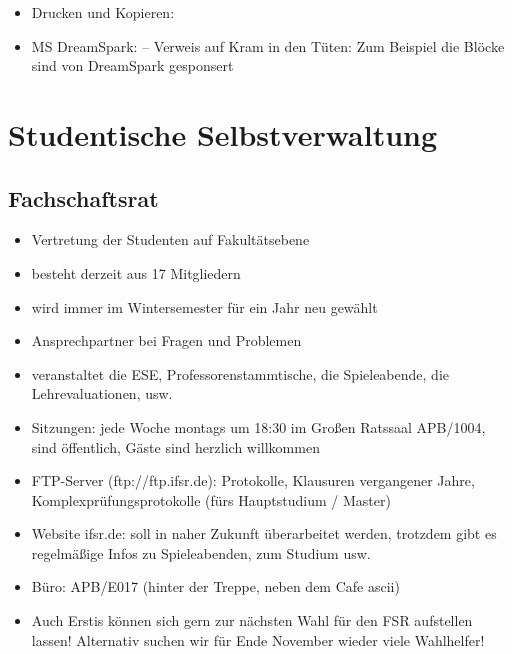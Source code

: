 \documentclass[a4paper,12pt]{report}
\begin{document}
\begin{itemize}
	\item Drucken und Kopieren: 
	\item MS DreamSpark: -- Verweis auf Kram in den Tüten: Zum Beispiel die Blöcke sind von DreamSpark gesponsert
\end{itemize}


\section{Studentische Selbstverwaltung}

\subsection{Fachschaftsrat}
\begin{itemize}
	\item Vertretung der Studenten auf Fakultätsebene
	\item besteht derzeit aus 17 Mitgliedern
	\item wird immer im Wintersemester für ein Jahr neu gewählt
	\item Ansprechpartner bei Fragen und Problemen
	\item veranstaltet die ESE, Professorenstammtische, die Spieleabende, die Lehrevaluationen, usw.
	\item Sitzungen: jede Woche montags um 18:30 im Großen Ratssaal APB/1004, sind öffentlich, Gäste sind herzlich willkommen
	\item FTP-Server (ftp://ftp.ifsr.de): Protokolle, Klausuren vergangener Jahre, Komplexprüfungsprotokolle (fürs Hauptstudium / Master)
	\item Website ifsr.de: soll in naher Zukunft überarbeitet werden, trotzdem gibt es regelmäßige Infos zu Spieleabenden, zum Studium usw.
	\item Büro: APB/E017 (hinter der Treppe, neben dem Cafe ascii)
	\item Auch Erstis können sich gern zur nächsten Wahl für den FSR aufstellen lassen! Alternativ suchen wir für Ende November wieder viele Wahlhelfer!
\end{itemize}
\end{document}
